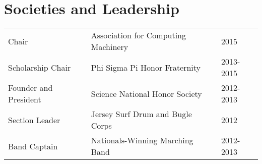 \documentclass[letterpaper]{deedy-resume} %
\begin{document}
\begin{minipage}[t]{0.66\textwidth}

\section{Societies and Leadership} 

\begin{tabular}{lll}
Chair & Association for Computing Machinery & 2015\\
Scholarship Chair & Phi Sigma Pi Honor Fraternity & 2013-2015\\
Founder and President & Science National Honor Society & 2012-2013\\
Section Leader & Jersey Surf Drum and Bugle Corps & 2012\\
Band Captain & Nationals-Winning Marching Band & 2012-2013\\
\end{tabular}

\sectionspace %


\end{minipage} %








\end{document}
